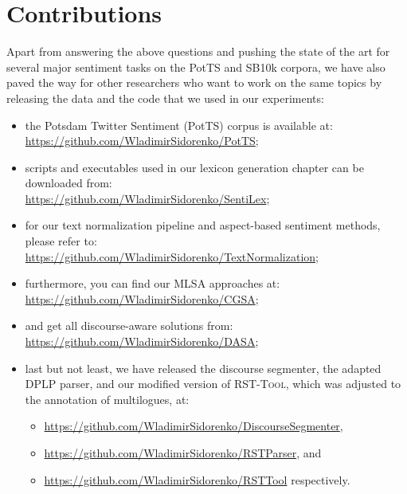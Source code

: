 \section*{Contributions}

Apart from answering the above questions and pushing the state of the
art for several major sentiment tasks on the PotTS and SB10k corpora,
we have also paved the way for other researchers who want to work on
the same topics by releasing the data and the code that we used in our
experiments:
\begin{itemize}
\item the Potsdam Twitter Sentiment (PotTS) corpus is available at:\\
  \url{https://github.com/WladimirSidorenko/PotTS};
\item scripts and executables used in our lexicon generation chapter
  can be downloaded
  from:\\ \url{https://github.com/WladimirSidorenko/SentiLex};
\item for our text normalization pipeline and aspect-based sentiment
  methods, please refer to:\\
  \url{https://github.com/WladimirSidorenko/TextNormalization};
\item furthermore, you can find our MLSA approaches
  at:\\ \url{https://github.com/WladimirSidorenko/CGSA};
\item and get all discourse-aware solutions
  from:\\ \url{https://github.com/WladimirSidorenko/DASA};
\item last but not least, we have released the discourse segmenter,
  the adapted DPLP parser, and our modified version of
  \textsc{RST-Tool}, which was adjusted to the annotation of
  multilogues, at:
  \begin{itemize}
  \item\url{https://github.com/WladimirSidorenko/DiscourseSegmenter},
  \item\url{https://github.com/WladimirSidorenko/RSTParser}, and
  \item\url{https://github.com/WladimirSidorenko/RSTTool} respectively.
  \end{itemize}
\end{itemize}

